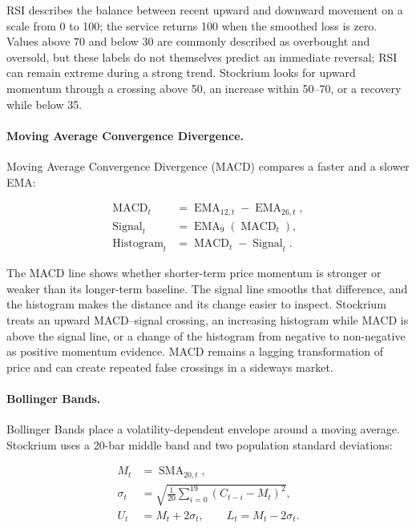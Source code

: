 RSI describes the balance between recent upward and downward movement on a scale from 0 to 100; the service returns 100 when the smoothed loss is zero. Values above 70 and below 30 are commonly described as overbought and oversold, but these labels do not themselves predict an immediate reversal; RSI can remain extreme during a strong trend. Stockrium looks for upward momentum through a crossing above 50, an increase within 50--70, or a recovery while below 35.

\paragraph{Moving Average Convergence Divergence.}

Moving Average Convergence Divergence (MACD) compares a faster and a slower EMA:

\begin{align}
    \operatorname{MACD}_t
      &=\operatorname{EMA}_{12,t}-\operatorname{EMA}_{26,t}, \\
    \operatorname{Signal}_t
      &=\operatorname{EMA}_{9}(\operatorname{MACD}_t), \\
    \operatorname{Histogram}_t
      &=\operatorname{MACD}_t-\operatorname{Signal}_t.
    \label{eq:technical-macd}
\end{align}

The MACD line shows whether shorter-term price momentum is stronger or weaker than its longer-term baseline. The signal line smooths that difference, and the histogram makes the distance and its change easier to inspect. Stockrium treats an upward MACD--signal crossing, an increasing histogram while MACD is above the signal line, or a change of the histogram from negative to non-negative as positive momentum evidence. MACD remains a lagging transformation of price and can create repeated false crossings in a sideways market.

\paragraph{Bollinger Bands.}

Bollinger Bands place a volatility-dependent envelope around a moving average. Stockrium uses a 20-bar middle band and two population standard deviations:

\begin{align}
    M_t&=\operatorname{SMA}_{20,t}, \\
    \sigma_t
      &=\sqrt{\frac{1}{20}\sum_{i=0}^{19}(C_{t-i}-M_t)^2}, \\
    U_t&=M_t+2\sigma_t, \qquad
    L_t=M_t-2\sigma_t.
    \label{eq:technical-bollinger}
\end{align}

